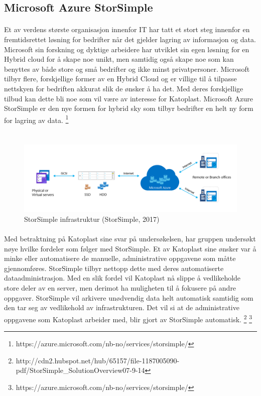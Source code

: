 \subsection{Microsoft Azure StorSimple}
\paragraph{} Et av verdens største organisasjon innenfor IT har tatt et stort steg innenfor en fremtidsrettet løsning for bedrifter når det gjelder lagring av informasjon og data. Microsoft sin forskning og dyktige arbeidere har utviklet sin egen løsning for en Hybrid cloud for å skape noe unikt, men samtidig også skape noe som kan benyttes av både store og små bedrifter og ikke minst privatpersoner. Microsoft tilbyr flere, forskjellige former av en Hybrid Cloud og er villige til å tilpasse nettskyen for bedriften akkurat slik de ønsker å ha det. Med deres forskjellige tilbud kan dette bli noe som vil være av interesse for Katoplast. Microsoft Azure StorSimple er den nye formen for hybrid sky som tilbyr bedrifter en helt ny form for lagring av data.
\footnote{https://azure.microsoft.com/nb-no/services/storsimple/}

\section*{}
\begin{figure}[H]
\centering
\includegraphics[width=6.5in]{Bilder/storsimple.png}
\caption{StorSimple infrastruktur (StorSimple, 2017)}
\end{figure}

\paragraph{} Med betraktning på Katoplast sine svar på undersøkelsen, har gruppen undersøkt nøye hvilke fordeler som følger med StorSimple. Et av Katoplast sine ønsker var å minke eller automatisere de manuelle, administrative oppgavene som måtte gjennomføres. StorSimple tilbyr nettopp dette med deres automatiserte dataadministrasjon. Med en slik fordel vil Katoplast nå slippe å vedlikeholde store deler av en server, men derimot ha muligheten til å fokusere på andre oppgaver. StorSimple vil arkivere unødvendig data helt automatisk samtidig som den tar seg av vedlikehold av infrastrukturen. Det vil si at de administrative oppgavene som Katoplast arbeider med, blir gjort av StorSimple automatisk. 
\footnote{http://cdn2.hubspot.net/hub/65157/file-1187005090-pdf/StorSimple\_SolutionOverview07-9-14}
\footnote{https://azure.microsoft.com/nb-no/services/storsimple/}

